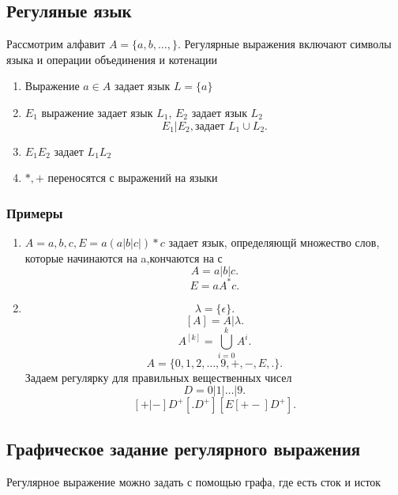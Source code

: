 \documentclass[14pt]{extarticle}
\begin{document}
\subsection{Регуляные язык}
Рассмотрим алфавит $A = \{a,b,\dots,\}$. Регулярные выражения включают символы языка и операции объединения и котенации
 \begin{enumerate}
     \item Выражение $a \in A$ задает язык  $L = \{a\}$
    \item  $E_1$ выражение задает язык $L_1$, $E_2$ задает язык $L_2$ 
        \[
            E_1 | E_2 ,\text{задает~} L_1 \cup L_2
        .\] 
    \item $E_1 E_2$ задает $L_1 L_2$
    \item $*,+$ переносятся с выражений на языки
\end{enumerate}
\subsubsection{Примеры}
\begin{enumerate}
    \item $A = {a,b,c}, E = a(a|b|c|)*c$ задает язык, определяющй множество слов, которые начинаются на a,кончаются на с 
         \[
        A = a|b|c
        .\] 
        \[
        E = a A^{*}c
        .\]
    \item 
        \[
            \lambda = \{\epsilon\}
        .\] 
        \[
            [A] = A|\lambda
        .\] 
        \[
            A^{[k]} = \bigcup \limits_{i = 0}^{k} A^{i}
        .\] 
        \[
            A = \{0,1,2,\dots,9,+,-,E,.\}
        .\] 
        Задаем регулярку для правильных вещественных чисел
        \[
        D = 0|1|\dots|9
        .\] 
        \[
            [+|-]D^{+}[.D^{+}][E[+-]D^{+}]
        .\] 
\end{enumerate}
\subsection{Графическое задание регулярного выражения}
Регулярное выражение можно задать с помощью графа, где есть сток и исток
\end{document}
